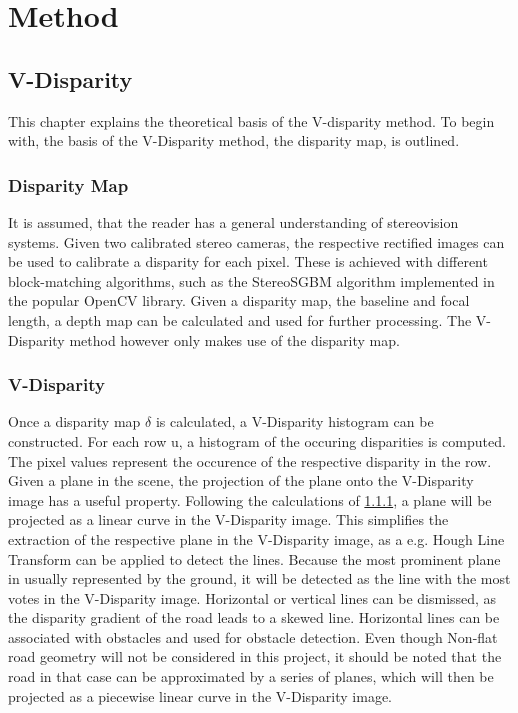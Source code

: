 
\chapter{Method}
\label{chp:Method}

\section{V-Disparity}

This chapter explains the theoretical basis of the V-disparity method. To begin with, the basis of the V-Disparity method, the disparity map, is outlined. 

\subsection{Disparity Map} \label{sbs:method_dispmap}
It is assumed, that the reader has a general understanding of stereovision systems. Given two calibrated stereo cameras, the respective rectified images can be used to calibrate a disparity for each pixel. These is achieved with different block-matching algorithms, such as the StereoSGBM algorithm implemented in the popular OpenCV library. Given a disparity map, the baseline and focal length, a depth map can be calculated and used for further processing. The V-Disparity method however only makes use of the disparity map.



\subsection{V-Disparity}

Once a disparity map $\delta$ is calculated, a V-Disparity histogram can be constructed. For each row u, a histogram of the occuring disparities is computed. The pixel values represent the occurence of the respective disparity in the row. Given a plane in the scene, the projection of the plane onto the V-Disparity image has a useful property. Following the calculations of \ref{sbs:method_dispmap}, a plane will be projected as a linear curve in the V-Disparity image. This simplifies the extraction of the respective plane in the V-Disparity image, as a e.g. Hough Line Transform can be applied to detect the lines.
\newline
Because the most prominent plane in usually represented by the ground, it will be detected as the line with the most votes in the V-Disparity image. Horizontal or vertical lines can be dismissed, as the disparity gradient of the road leads to a skewed line.
Horizontal lines can be associated with obstacles and used for obstacle detection.
Even though Non-flat road geometry will not be considered in this project, it should be noted that the road in that case can be approximated by a series of planes, which will then be projected as a piecewise linear curve in the V-Disparity image.

